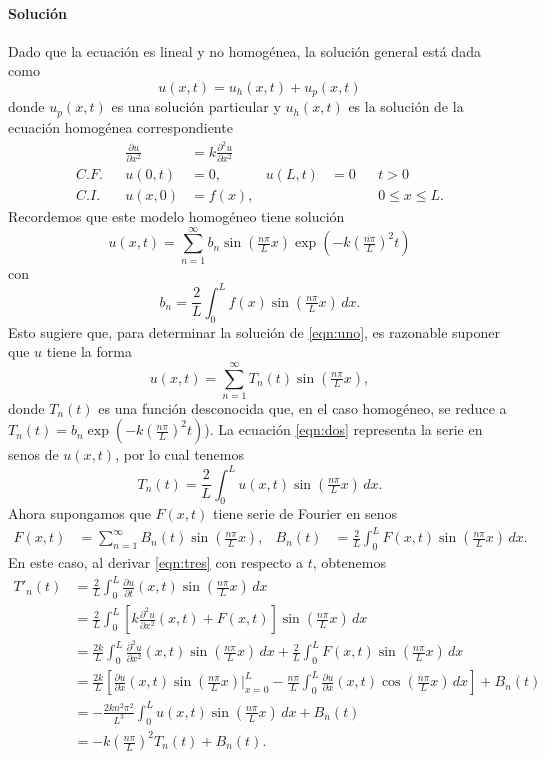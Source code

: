 \documentclass[11pt,letterpaper,draft]{report}
\theoremstyle{plain}
\theoremstyle{definition}
\theoremstyle{remark}
\newcommand\<{\langle}
\renewcommand\>{\rangle}
\begin{document}
\paragraph{Solución}
Dado que la ecuación es lineal y no homogénea, la solución general
está dada como
\[
  u(x,t) = u_h(x,t)+u_p(x,t)
\]
donde $u_p(x,t)$ es una solución particular y
$u_h(x,t)$ es la solución de la ecuación homogénea correspondiente
\begin{align*}
  && \frac{\partial u}{\partial x^2}
  &=k \frac{\partial^2 u}{\partial x^2} \\
  C.F. && u(0,t) &= 0, & u(L,t)&= 0 && t>0 \\
  C.I. && u(x,0) &= f(x), &&&& 0\leq x\leq L.
\end{align*}
Recordemos que este modelo homogéneo tiene solución
\[
  u(x,t)
  =
  \sum_{n=1}^{\infty}b_n\sin(\tfrac{n\pi}{L}x)
  \exp(-k(\tfrac{n\pi}{L})^2t)
\]
con
\[
  b_n=\frac{2}{L}\int_{0}^{L}f(x)\sin(\tfrac{n\pi}{L}x)\,dx
.\]
Esto sugiere que, para determinar la solución de \eqref{eqn:uno},
es razonable suponer que $u$ tiene la forma
\begin{equation}\label{eqn:dos}
  u(x,t) = \sum_{n=1}^{\infty}T_n(t)\sin(\tfrac{n\pi}{L}x),
\end{equation}
donde $T_n(t)$ es una función desconocida que, en el caso homogéneo,
se reduce a $T_n(t)=b_n\exp(-k(\tfrac{n\pi}{L})^2t)$).
La ecuación \eqref{eqn:dos} representa la serie en senos de $u(x,t)$,
por lo cual tenemos
\begin{equation}\label{eqn:tres}
  T_n(t) = \frac{2}{L} \int_{0}^{L}u(x,t)\sin(\tfrac{n\pi}{L}x)\,dx.
\end{equation}
Ahora supongamos que $F(x,t)$ tiene serie de Fourier en senos
\begin{align*}
  F(x,t)
  &= \sum_{n=1}^{\infty}B_n(t)\sin(\tfrac{n\pi}{L}x),
  &B_n(t)
  &= \frac{2}{L}\int_{0}^{L}F(x,t)\sin(\tfrac{n\pi}{L}x)\,dx.
\end{align*}
En este caso, al derivar \eqref{eqn:tres} con respecto a $t$, obtenemos
\begin{align*}
  T'_n(t)
  &=
  \frac{2}{L}\int_{0}^{L}\frac{\partial u}{\partial t}(x,t)
  \sin(\tfrac{n\pi}{L}x)\,dx \\
  &=
  \frac{2}{L}\int_{0}^{L}
  \left[
  k \frac{\partial^2u}{\partial x^2}(x,t)+F(x,t)
          \right]
  \sin(\tfrac{n\pi}{L}x)\,dx \\
  &=
  \frac{2k}{L}\int_{0}^{L}
  \frac{\partial^2u}{\partial x^2}(x,t)
  \sin(\tfrac{n\pi}{L}x)\,dx
  +
  \frac{2}{L}\int_{0}^{L}
  F(x,t)
  \sin(\tfrac{n\pi}{L}x)\,dx \\
  &=
  \frac{2k}{L}\left[
    \frac{\partial u}{\partial x}(x,t)\sin(\tfrac{n\pi}{L}x)\Big|_{x=0}^L
    -
    \frac{n\pi}{L}\int_{0}^{L}\frac{\partial u}{\partial x}(x,t)
    \cos(\tfrac{n\pi}{L}x)\,dx
  \right]
  +B_n(t) \\
  &=
  -\frac{2kn^2\pi^2}{L^3}\int_{0}^{L}u(x,t)\sin(\tfrac{n\pi}{L}x)\,dx
  +B_n(t) \\
  &= -k(\tfrac{n\pi}{L})^2T_n(t)+B_n(t).
\end{align*}
\end{document}
